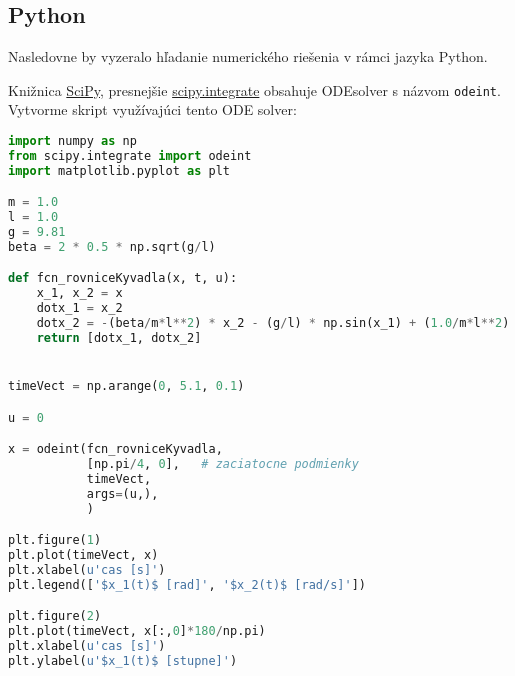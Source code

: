 \documentclass[a4paper, 10pt, ]{article}
\begin{document}
\subsection{Python}

Nasledovne by vyzeralo hľadanie numerického riešenia v rámci jazyka Python.


Knižnica \href{https://www.scipy.org/}{\color{NavyBlue} SciPy}, presnejšie \href{https://docs.scipy.org/doc/scipy-0.18.1/reference/integrate.html}{\color{NavyBlue} scipy.integrate} obsahuje ODEsolver s názvom \verb|odeint|. Vytvorme skript využívajúci tento ODE solver:


\begin{lstlisting}[language=Python, title=Skript v Python-e]
import numpy as np
from scipy.integrate import odeint
import matplotlib.pyplot as plt

m = 1.0
l = 1.0
g = 9.81
beta = 2 * 0.5 * np.sqrt(g/l)

def fcn_rovniceKyvadla(x, t, u):
    x_1, x_2 = x
    dotx_1 = x_2
    dotx_2 = -(beta/m*l**2) * x_2 - (g/l) * np.sin(x_1) + (1.0/m*l**2) * u
    return [dotx_1, dotx_2]


timeVect = np.arange(0, 5.1, 0.1)

u = 0

x = odeint(fcn_rovniceKyvadla,
           [np.pi/4, 0],   # zaciatocne podmienky
           timeVect,
           args=(u,),
           )

plt.figure(1)
plt.plot(timeVect, x)
plt.xlabel(u'cas [s]')
plt.legend(['$x_1(t)$ [rad]', '$x_2(t)$ [rad/s]'])

plt.figure(2)
plt.plot(timeVect, x[:,0]*180/np.pi)
plt.xlabel(u'cas [s]')
plt.ylabel(u'$x_1(t)$ [stupne]')
\end{lstlisting}
\end{document}
